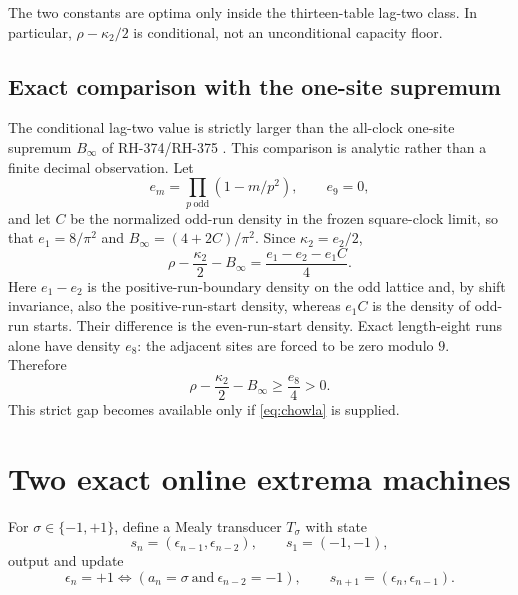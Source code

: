 \documentclass[11pt]{article}
\theoremstyle{definition}
\theoremstyle{remark}
\newcommand{\SSS}{\{-1,+1\}}
\newcommand{\rhoone}{\rho}
\newcommand{\kappatwo}{\kappa_2}
\begin{document}
The two constants are optima only inside the thirteen-table lag-two class.
In particular, $\rhoone-\kappatwo/2$ is conditional, not an unconditional
capacity floor.

\subsection{Exact comparison with the one-site supremum}

The conditional lag-two value is strictly larger than the all-clock
one-site supremum $B_\infty$ of RH-374/RH-375
\cite{RH374,RH375}.  This comparison is analytic rather than a finite
decimal observation.  Let
\[
 e_m=\prod_{p\ \mathrm{odd}}(1-m/p^2),\qquad e_9=0,
\]
and let $C$ be the normalized odd-run density in the frozen square-clock
limit, so that $e_1=8/\pi^2$ and
$B_\infty=(4+2C)/\pi^2$.  Since
$\kappatwo=e_2/2$,
\begin{equation}
 \rhoone-\frac{\kappatwo}{2}-B_\infty
        =\frac{e_1-e_2-e_1C}{4}.
 \label{eq:strict-comparison}
\end{equation}
Here $e_1-e_2$ is the positive-run-boundary density on the odd lattice and,
by shift invariance, also the positive-run-start density, whereas $e_1C$ is
the density of odd-run starts.  Their difference is the even-run-start
density.  Exact length-eight runs alone have density $e_8$:
the adjacent sites are forced to be zero modulo $9$.  Therefore
\begin{equation}
       \rhoone-\frac{\kappatwo}{2}-B_\infty
       \ge \frac{e_8}{4}>0.
       \label{eq:positive-gap}
\end{equation}
This strict gap becomes available only if \eqref{eq:chowla} is supplied.

\section{Two exact online extrema machines}

For $\sigma\in\SSS$, define a Mealy transducer $T_\sigma$ with state
\begin{equation}
             s_n=(\epsilon_{n-1},\epsilon_{n-2}),\qquad s_1=(-1,-1),
             \label{eq:state}
\end{equation}
output and update
\begin{equation}
 \epsilon_n=+1\Longleftrightarrow
        (a_n=\sigma\ \text{and}\ \epsilon_{n-2}=-1),
 \qquad s_{n+1}=(\epsilon_n,\epsilon_{n-1}).
 \label{eq:greedy}
\end{equation}
\end{document}
